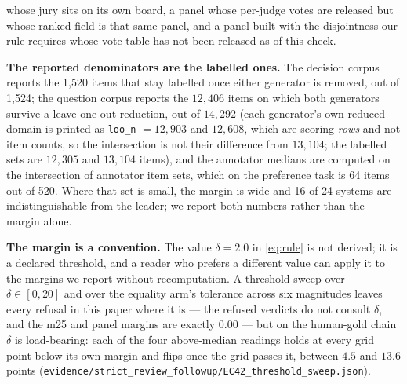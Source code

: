 \documentclass{article}
\newcommand{\ids}[1]{\texttt{\small #1}} %
\begin{document}
whose jury sits on its own board, a panel whose per-judge votes are released but whose ranked field is that same panel, and a panel built with the disjointness our rule requires whose vote table has not been released as of this check.

\textbf{The reported denominators are the labelled ones.} The decision corpus reports the 1,520 items that stay labelled once either generator is removed, out of 1,524; the question corpus reports the $12,406$ items on which both generators survive a leave-one-out reduction, out of $14,292$ (each generator's own reduced domain is printed as \texttt{loo\_n} $=12,903$ and $12,608$, which are scoring \emph{rows} and not item counts, so the intersection is not their difference from $13,104$; the labelled sets are $12,305$ and $13,104$ items), and the annotator medians are computed on the intersection of annotator item sets, which on the preference task is 64 items out of 520. Where that set is small, the margin is wide and 16 of 24 systems are indistinguishable from the leader; we report both numbers rather than the margin alone.

\textbf{The margin is a convention.} The value $\delta = 2.0$ in \eqref{eq:rule} is not derived; it is a declared threshold, and a reader who prefers a different value can apply it to the margins we report without recomputation. A threshold sweep over $\delta \in [0,20]$ and over the equality arm's tolerance across six magnitudes leaves every refusal in this paper where it is --- the refused verdicts do not consult $\delta$, and the m25 and panel margins are exactly $0.00$ --- but on the human-gold chain $\delta$ is load-bearing: each of the four above-median readings holds at every grid point below its own margin and flips once the grid passes it, between $4.5$ and $13.6$ points (\ids{evidence/strict\_review\_followup/EC42\_threshold\_sweep.json}).
\end{document}
